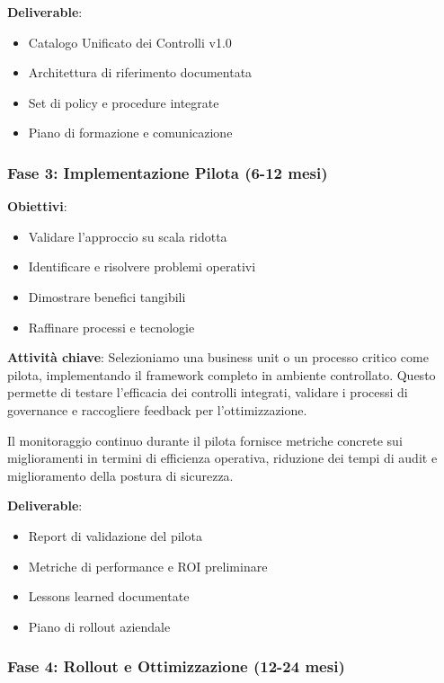 \textbf{Deliverable}:
\begin{itemize}
    \item Catalogo Unificato dei Controlli v1.0
    \item Architettura di riferimento documentata
    \item Set di policy e procedure integrate
    \item Piano di formazione e comunicazione
\end{itemize}

\subsubsection{\texorpdfstring{Fase 3: Implementazione Pilota (6-12 mesi)}{4.6.2.3 - Fase 3: Implementazione Pilota (6-12 mesi)}}

\textbf{Obiettivi}:
\begin{itemize}
    \item Validare l'approccio su scala ridotta
    \item Identificare e risolvere problemi operativi
    \item Dimostrare benefici tangibili
    \item Raffinare processi e tecnologie
\end{itemize}

\textbf{Attività chiave}:
Selezioniamo una business unit o un processo critico come pilota, implementando il framework completo in ambiente controllato. Questo permette di testare l'efficacia dei controlli integrati, validare i processi di governance e raccogliere feedback per l'ottimizzazione.

Il monitoraggio continuo durante il pilota fornisce metriche concrete sui miglioramenti in termini di efficienza operativa, riduzione dei tempi di audit e miglioramento della postura di sicurezza.

\textbf{Deliverable}:
\begin{itemize}
    \item Report di validazione del pilota
    \item Metriche di performance e ROI preliminare
    \item Lessons learned documentate
    \item Piano di rollout aziendale
\end{itemize}

\subsubsection{\texorpdfstring{Fase 4: Rollout e Ottimizzazione (12-24 mesi)}{4.6.2.4 - Fase 4: Rollout e Ottimizzazione (12-24 mesi)}}

